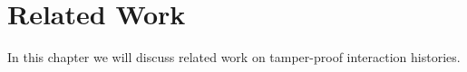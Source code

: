 \chapter{Related Work}
In this chapter we will discuss related work on tamper-proof interaction histories.



